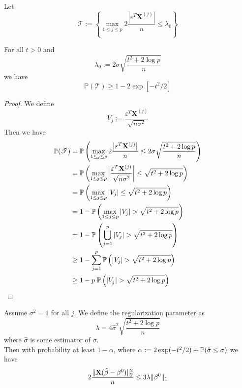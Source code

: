 Let
$$\mathscr{T} := \left\{\max _{1 \leq j \leq p} 2 \frac{\left| \varepsilon^{T} \mathbf{X}^{(j)}\right|}{n} \leq \lambda_{0}\right\}$$

\begin{lemma}[Lemma 6.2.]
    For all $t > 0$ and
    $$\lambda_{0}:=2 \sigma \sqrt{\frac{t^{2}+2 \log p}{n}}$$
    we have
    $$\mathbb{P}(\mathscr{T}) \geq 1-2 \exp \left[-t^{2} / 2\right]$$
\end{lemma}
\begin{proof}
    We define
    $$V_{j} := \frac{\varepsilon^{T} \mathbf{X}^{(j)}}{\sqrt{n \sigma^{2}}}$$
    Then we have
    \begin{align*}
        \mathbb{P}(\mathscr{T})
         & = \P \left( \max _{1 \leq j \leq p} 2 \frac{\left| \varepsilon^{T} \mathbf{X}^{(j)}\right|}{n} \leq 2 \sigma \sqrt{\frac{t^{2}+2 \log p}{n}}  \right) \\
         & =
        \P \left( \max _{1 \leq j \leq p} \left| \frac{\varepsilon^{T} \mathbf{X}^{(j)}}{\sqrt{n \sigma^{2}}} \right| \leq \sqrt{t^{2}+2 \log p}  \right)        \\
         & =
        \P \left( \max _{1 \leq j \leq p} | V_{j} | \leq \sqrt{t^{2}+2 \log p}  \right)                                                                          \\
         & = 1 - \P \left( \max _{1 \leq j \leq p} | V_{j} | > \sqrt{t^{2}+2 \log p}  \right)                                                                    \\
         & = 1 - \P \left( \bigcup_{j = 1}^{p} | V_{j} | > \sqrt{t^{2}+2 \log p}  \right)                                                                        \\
         & \geq 1 - \sum_{j = 1}^{p} \P \left( | V_{j} | > \sqrt{t^{2}+2 \log p}  \right)                                                                        \\
         & \geq 1 - p \; \P \left( | V_{j} | > \sqrt{t^{2}+2 \log p}  \right)                                                                                    \\
    \end{align*}
\end{proof}

\begin{corollary}
    Assume $\sigma^2 = 1$ for all $j$. We define the regularization parameter as
    $$\lambda = 4 \hat \sigma^2 \sqrt{\frac{t^2 + 2 \log p}{n}}$$
    where $\hat \sigma$ is some estimator of $\sigma$. \\
    Then with probability at least $1 - \alpha$, where $\alpha := 2 \exp(-t^2/2) + \P (\hat \sigma \leq \sigma)$ we have
    $$2 \frac{\| \X (\hat \beta - \beta^0)\|_2^2}{n} \leq 3 \lambda \| \beta^0 \|_1$$
\end{corollary}

